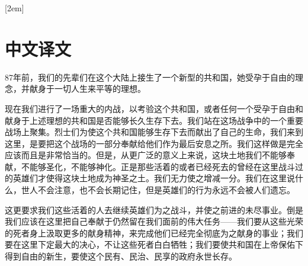 
[2em]{\vspace{.5\baselineskip}\xiaosan\song}
             {\prechaptername\CJKnumber{\thecontentslabel}\postchaptername\qquad}{}
             {}             %
\setcounter{page}{1}            %
\chapter*{中文译文}


87年前，我们的先辈们在这个大陆上接生了一个新型的共和国，她受孕于自由的理念，并献身于一切人生来平等的理想。

现在我们进行了一场重大的内战，以考验这个共和国，或者任何一个受孕于自由和献身于上述理想的共和国是否能够长久生存下去。我们站在这场战争中的一个重要战场上聚集。烈士们为使这个共和国能够生存下去而献出了自己的生命，我们来到这里，是要把这个战场的一部分奉献给他们作为最后安息之所。我们这样做是完全应该而且是非常恰当的。但是，从更广泛的意义上来说，这块土地我们不能够奉献，不能够圣化，不能够神化。正是那些活着的或者已经死去的曾经在这里战斗过的英雄们才使得这块土地成为神圣之土。我们无力使之增减一分。我们在这里说什么，世人不会注意，也不会长期记住，但是英雄们的行为永远不会被人们遗忘。

这更要求我们这些活着的人去继续英雄们为之战斗，并使之前进的未尽事业。倒是我们应该在这里把自己奉献于仍然留在我们面前的伟大任务——我们要从这些光荣的死者身上汲取更多的献身精神，来完成他们已经完全彻底为之献身的事业；我们要在这里下定最大的决心，不让这些死者白白牺牲；我们要使共和国在上帝保佑下得到自由的新生，要使这个民有、民治、民享的政府永世长存。